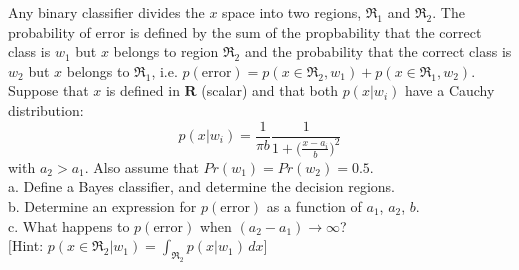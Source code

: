 \Exercise[number={10}]
Any binary classifier divides the \(x\) space into two regions,
\(\mathfrak{R}_1\) and \(\mathfrak{R}_2\). The probability of error is
defined by the sum of the propbability that the correct class is \(w_1\)
but \(x\) belongs to region \(\mathfrak{R}_2\) and the probability that
the correct class is \(w_2\) but \(x\) belongs to \(\mathfrak{R}_1\), i.e.
\(p(\text{error})=p(x\in\mathfrak{R}_2, w_1)+p(x\in\mathfrak{R}_1, w_2)\).
Suppose that \(x\) is defined in \(\mathbf{R}\) (scalar) and that both
\(p(x|w_i)\) have a Cauchy distribution:
\[
    p(x|w_i)=\frac{1}{\pi b}\frac{1}{1+\bigl(\frac{x-a_i}{b}\bigr)^2}
\]
with \(a_2>a_1\). Also assume that \(Pr(w_1)=Pr(w_2)=0.5\).\\
a. Define a Bayes classifier, and determine the decision regions.\\
b. Determine an expression for \(p(\text{error})\) as a function of
\(a_1\), \(a_2\), \(b\).\\
c. What happens to \(p(\text{error})\) when \((a_2-a_1)\to\infty\)?\\
\(\bigl[\)Hint: \(p(x\in\mathfrak{R}_2|w_1)=\int_{\mathfrak{R}_2}p(x|w_1)\,dx\)\(\bigr]\)

